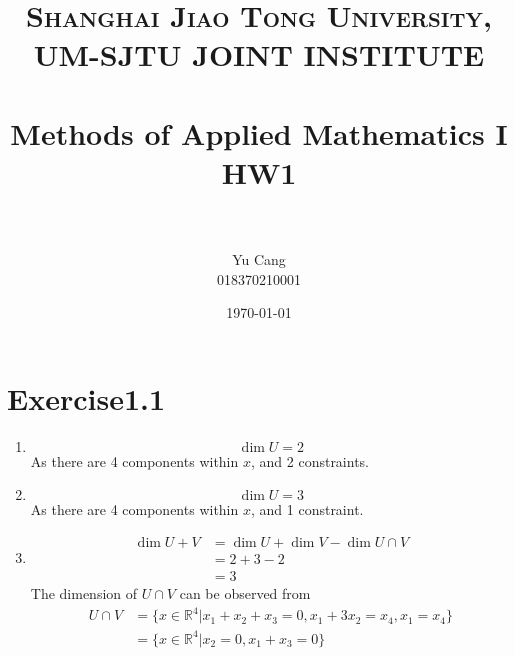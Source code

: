 \documentclass[paper=a4, fontsize=11pt]{scrartcl} %
\title{	
\normalfont \normalsize 
\textsc{Shanghai Jiao Tong University, UM-SJTU JOINT INSTITUTE} \\ [25pt] %
\horrule{0.5pt} \\[0.4cm] %
\huge Methods of Applied Mathematics I\\ HW1 \\ %
\horrule{2pt} \\[0.5cm] %
}
\author{Yu Cang \\ 018370210001} %
\date{\normalsize \today} %
\numberwithin{equation}{section} %
\numberwithin{figure}{section} %
\numberwithin{table}{section} %
\begin{document}
\maketitle %

\section{Exercise1.1}
\begin{enumerate}
	\item 
		\begin{equation}
			\dim{U} = 2
		\end{equation}
		As there are 4 components within $x$, and 2 constraints.
	\item 
		\begin{equation}
			\dim{U} = 3
		\end{equation}
		As there are 4 components within $x$, and 1 constraint.
	\item 
		\begin{equation}
			\begin{aligned}
				\dim{U+V} & = \dim{U} + \dim{V} - \dim{U \cap V} \\
				          & = 2 + 3 - 2 \\
				          & = 3
			\end{aligned}
		\end{equation}
		The dimension of $U \cap V$ can be observed from
		\begin{equation}
			\begin{aligned}
				U \cap V & = \{x\in \mathbb{R}^4| x_1 + x_2 + x_3 = 0, x_1 + 3 x_2 = x_4, x_1 = x_4\}\\
				         & = \{x\in \mathbb{R}^4| x_2 = 0, x_1 + x_3 = 0\}
			\end{aligned}
		\end{equation}
\end{enumerate}
\end{document}
